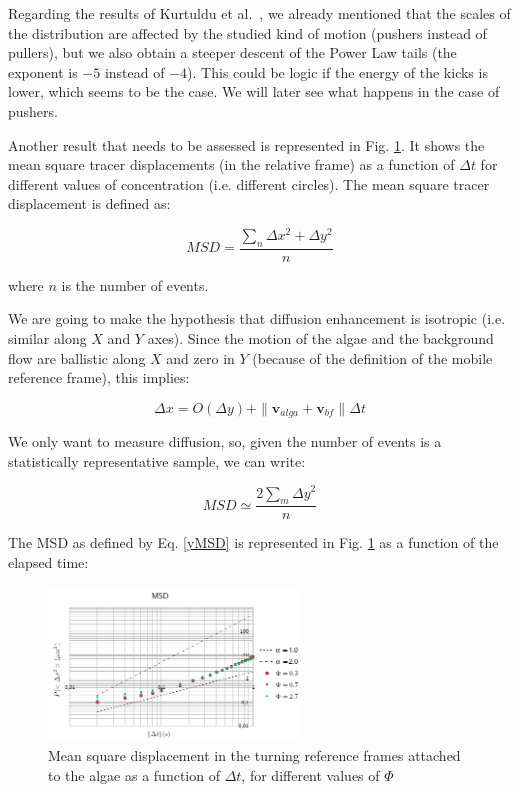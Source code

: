 Regarding the results of Kurtuldu et al.~\cite{Kurtuldu2011}, we already mentioned that the scales of the distribution are affected by the studied kind of motion (pushers instead of pullers), but we also obtain a steeper descent of the Power Law tails (the exponent is $-5$ instead of $-4$). This could be logic if the energy of the kicks is lower, which seems to be the case. We will later see what happens in the case of pushers.

Another result that needs to be assessed is represented in Fig. \ref{MSD_e3}. It shows the mean square tracer displacements (in the relative frame) as a function of  $\Delta t$ for different values of concentration (i.e. different circles). The mean square tracer displacement is defined as:

\begin{equation}
MSD = \frac{\displaystyle\sum_{n} \Delta x ^ 2 + \Delta y ^ 2}{n}
\end{equation}

where $n$ is the number of events. 

We are going to make the hypothesis that diffusion enhancement is isotropic (i.e. similar along $X$ and $Y$ axes). Since the motion of the algae and the background flow are ballistic along $X$ and zero in $Y$ (because of the definition of the mobile reference frame), this implies:

\begin{equation}
\Delta x = O(\Delta y) + \| \mathbf{v}_{alga} + \mathbf{v}_{bf} \| \Delta t
\end{equation}

We only want to measure diffusion, so, given the number of events is a statistically representative sample, we can write:

\begin{equation}
MSD \simeq \frac{2 \displaystyle\sum_{m} \Delta y^{2}}{n}
\label{yMSD}
\end{equation}

The MSD as defined by Eq. \ref{yMSD} is represented in Fig. \ref{MSD_e3} as a function of the elapsed time:

\begin{figure}[H]
	\centering
	\includegraphics[width=0.6\textwidth]{archivos/MSD_e3.png}
	\caption{Mean square displacement in the turning reference frames attached to the algae as a function of $\Delta t$, for different values of $\Phi$}
	\label{MSD_e3}
\end{figure}

